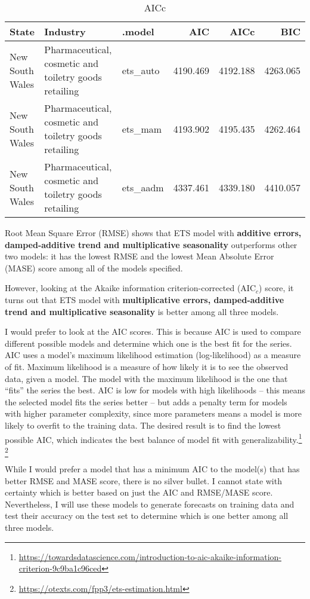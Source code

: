 \documentclass[
]{article}
\begin{document}
\begin{table}

\caption{\label{tab:unnamed-chunk-7}AICc}
\centering
\begin{tabular}[t]{l|l|l|r|r|r}
\hline
State & Industry & .model & AIC & AICc & BIC\\
\hline
New South Wales & Pharmaceutical, cosmetic and toiletry goods retailing & ets\_auto & 4190.469 & 4192.188 & 4263.065\\
\hline
New South Wales & Pharmaceutical, cosmetic and toiletry goods retailing & ets\_mam & 4193.902 & 4195.435 & 4262.464\\
\hline
New South Wales & Pharmaceutical, cosmetic and toiletry goods retailing & ets\_aadm & 4337.461 & 4339.180 & 4410.057\\
\hline
\end{tabular}
\end{table}

Root Mean Square Error (RMSE) shows that ETS model with \textbf{additive
errors, damped-additive trend and multiplicative seasonality}
outperforms other two models: it has the lowest RMSE and the lowest Mean
Absolute Error (MASE) score among all of the models specified.

However, looking at the Akaike information criterion-corrected
(AIC\(_c\)) score, it turns out that ETS model with
\textbf{multiplicative errors, damped-additive trend and multiplicative
seasonality} is better among all three models.

I would prefer to look at the AIC scores. This is because AIC is used to
compare different possible models and determine which one is the best
fit for the series. AIC uses a model's maximum likelihood estimation
(log-likelihood) as a measure of fit. Maximum likelihood is a measure of
how likely it is to see the observed data, given a model. The model with
the maximum likelihood is the one that ``fits'' the series the best. AIC
is low for models with high likelihoods -- this means the selected model
fits the series better -- but adds a penalty term for models with higher
parameter complexity, since more parameters means a model is more likely
to overfit to the training data. The desired result is to find the
lowest possible AIC, which indicates the best balance of model fit with
generalizability.\footnote{\url{https://towardsdatascience.com/introduction-to-aic-akaike-information-criterion-9c9ba1c96ced}}
\footnote{\url{https://otexts.com/fpp3/ets-estimation.html}}

While I would prefer a model that has a minimum AIC to the model(s) that
has better RMSE and MASE score, there is no silver bullet. I cannot
state with certainty which is better based on just the AIC and RMSE/MASE
score. Nevertheless, I will use these models to generate forecasts on
training data and test their accuracy on the test set to determine which
is one better among all three models.
\end{document}
